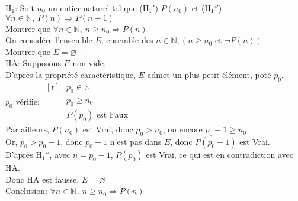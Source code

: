 \documentclass[12pt,twoside,a4paper]{article}
\begin{document}
		\begin{preuve}
			\underline{H$_1$}: Soit $n_0$ un entier naturel tel que (\underline{H$_1'$}) $P(n_0)$ et (\underline{H$_1''$}) $\forall n\in\mathbb{N},\ P(n)\Rightarrow P(n+1)$\\
			Montrer que $\forall n\in\mathbb{N},\ n\geqslant n_0\Rightarrow P(n)$\\
			On consid\`ere l'ensemble $E$, ensemble des $n\in\mathbb{N}, (n\geqslant n_0\text{ et }\neg P(n))$\\
			Montrer que $E=\varnothing$\\
			\underline{HA}: Supposons $E$ non vide.\\
			D'apr\`es la propri\'et\'e caract\'eristique, $E$ admet un plus petit \'el\'ement, pot\'e $p_0$.\\
			$p_0$ v\'erifie: $\begin{aligned}[t] & p_0\in\mathbb{N}\\ & p_0\geqslant n_0 \\ & P(p_0)\text{ est Faux}\end{aligned}$\\
			Par ailleurs, $P(n_0)$ est Vrai, donc $p_0>n_0$, ou encore $p_0-1\geqslant n_0$\\
			Or, $p_0>p_0-1$, donc $p_0-1$ n'est pas dans $E$, donc $P(p_0-1)$ est Vrai.\\
			D'apr\`es H$_1''$, avec $n=p_0-1$, $P(p_0)$ est Vrai, ce qui est en contradiction avec HA.\\
			Donc HA est fausse, $E=\varnothing$\\
			Conclusion: $\forall n\in\mathbb{N},\ n\geqslant n_0\Rightarrow P(n)$
		\end{preuve}
\end{document}
